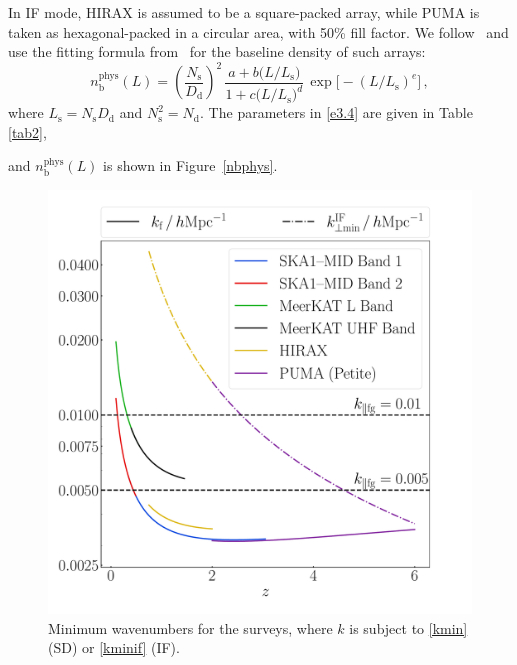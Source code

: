In IF mode, HIRAX is assumed to be a square-packed array, while PUMA is taken as hexagonal-packed in a circular area, {with 50\% fill factor}. We follow~\cite{Karagiannis:2019jjx} and use the fitting formula from~\cite{Ansari:2018ury} for the baseline density of such arrays:
\begin{equation}
n_\mathrm{b}^\mathrm{phys}(L) = \left( \frac{N_\mathrm{s}}{D_\mathrm{d}}\right)^2\,\frac{a+b\big(L/L_\mathrm{s}\big)}{1+c\big(L/L_\mathrm{s}\big)^{d}}\,\exp{\big[-(L/L_\mathrm{s})^{e}\big]}\,, \label{e3.4}
\end{equation}
where  $L_\mathrm{s} =N_\mathrm{s}D_\mathrm{d}$ and $N_\mathrm{s}^2 = N_\mathrm{d}$.
The  parameters in \eqref{e3.4} are given in Table \ref{tab2}, {and $n_\mathrm{b}^\mathrm{phys}(L)$ is shown in Figure~\ref{nbphys}.
\begin{figure}%
\centering
\includegraphics[width=.49\textwidth]{fig/k}
\caption{{Minimum wavenumbers for the surveys, where $k$ is subject to \eqref{kmin} (SD) or \eqref{kminif} (IF).}}\label{figmin}
\end{figure}

}
